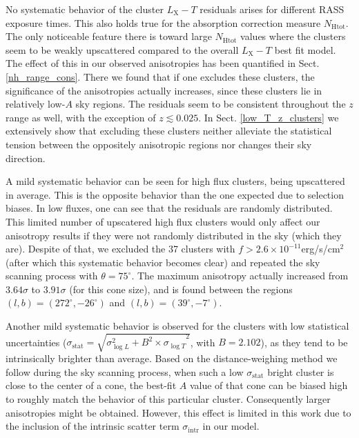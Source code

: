 \documentclass{aa}   %
\begin{document}
No systematic behavior of the cluster $L_{\text{X}}-T$ residuals arises for different RASS exposure times. This also holds true for the absorption correction measure $N_{\text{Htot}}$. The only noticeable feature there is toward large $N_{\text{Htot}}$ values where the clusters seem to be weakly upscattered compared to the overall $L_{\text{X}}-T$ best fit model. The effect of this in our observed anisotropies has been quantified in Sect. \ref{nh_range_cons}. There we found that if one excludes these clusters, the significance of the anisotropies actually increases, since these clusters lie in relatively low-$A$ sky regions. The residuals seem to be consistent throughout the $z$ range as well, with the exception of $z\lesssim 0.025$. In Sect. \ref{low_T_z_clusters} we extensively show that excluding these clusters neither alleviate the statistical tension between the oppositely anisotropic regions nor changes their sky direction.

A mild systematic behavior can be seen for high flux clusters, being upscattered in average. This is the opposite behavior than the one expected due to selection biases. In low fluxes, one can see that the residuals are randomly distributed. This limited number of upscatered high flux clusters would only affect our anisotropy results if they were not randomly distributed in the sky (which they are). Despite of that, we excluded the 37 clusters with $f>2.6\times 10^{-11}$erg/s/cm$^2$ (after which this systematic behavior becomes clear) and repeated the sky scanning process with $\theta=75^{\circ}$.  The maximum anisotropy actually increased from $3.64\sigma$ to $3.91\sigma$ (for this cone size), and is found between the regions  $(l,b)=(272^{\circ},-26^{\circ})$ and $(l,b)=(39^{\circ},-7^{\circ})$.


Another mild systematic behavior is observed for the clusters with low statistical uncertainties ($\sigma_{\text{stat}}=\sqrt{\sigma _{\log{L}}^2+{B^2\times \sigma _{\log{T}}}^2}$, with $B=2.102$), as they tend to be intrinsically brighter than average. Based on the distance-weighing method we follow during the sky scanning process, when such a low $\sigma_{\text{stat}}$ bright cluster is close to the center of a cone, the best-fit $A$ value of that cone can be biased high to roughly match the behavior of this particular cluster. Consequently larger anisotropies might be obtained. However, this effect is limited in this work due to the inclusion of the intrinsic scatter term $\sigma_{\text{intr}}$ in our model.
\end{document}

